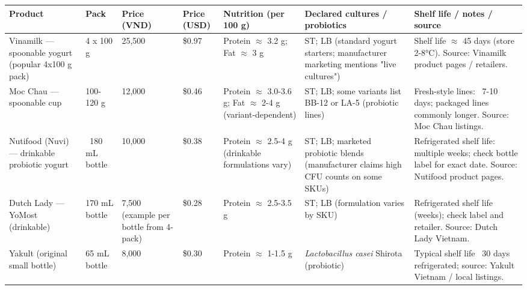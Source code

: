 \documentclass{iopjournal}
\begin{document}
\begin{table}[htbp]
  \centering
   \footnotesize
  \begin{threeparttable}
  \caption{Representative yogurt products in Vietnam — prices, nutrition and starter/probiotic notes.
    (Conversion used: 1 USD = 26,385 VND; prices and specs are illustrative snapshots from manufacturer/retailer listings.)}
  \label{tab:yogurt-vn} 
    \begin{longtable}{@{} Q T T T Q Q Q @{}}
  \toprule
  \textbf{Product} & \textbf{Pack} & \textbf{Price (VND)} & \textbf{Price (USD)} & \textbf{Nutrition (per 100 g)} & \textbf{Declared cultures / probiotics} & \textbf{Shelf life / notes / source} \\
  \midrule
  Vinamilk — spoonable yogurt (popular 4x100 g pack)
    & 4 x 100 g
    & 25,500
    & \$0.97
    & Protein $\approx$ 3.2 g; Fat $\approx$ 3 g
    & ST; LB (standard yogurt starters; manufacturer marketing mentions "live cultures")
    & Shelf life $\approx$ 45 days (store 2-8°C). Source: Vinamilk product pages / retailers. \\

  Moc Chau — spoonable cup
    & 100-120 g
    & 12,000
    & \$0.46
    & Protein $\approx$ 3.0-3.6 g; Fat $\approx$ 2-4 g (variant-dependent)
    & ST; LB; some variants list BB-12 or LA-5 (probiotic lines)
    & Fresh-style lines: ~7-10 days; packaged lines commonly longer. Source: Moc Chau listings. \\

  Nutifood (Nuvi) — drinkable probiotic yogurt
    & ~180 mL bottle
    & 10,000
    & \$0.38
    & Protein $\approx$ 2.5-4 g (drinkable formulations vary)
    & ST; LB; marketed probiotic blends (manufacturer claims high CFU counts on some SKUs)
    & Refrigerated shelf life: multiple weeks; check bottle label for exact date. Source: Nutifood product pages. \\

  Dutch Lady — YoMost (drinkable)
    & 170 mL bottle
    & 7,500 (example per bottle from 4-pack)
    & \$0.28
    & Protein $\approx$ 2.5-3.5 g
    & ST; LB (formulation varies by SKU)
    & Refrigerated shelf life (weeks); check label and retailer. Source: Dutch Lady Vietnam. \\

  Yakult (original small bottle)
    & 65 mL bottle
    & 8,000
    & \$0.30
    & Protein $\approx$ 1-1.5 g
    & \textit{Lactobacillus casei} Shirota (probiotic)
    & Typical shelf life ~30 days refrigerated; source: Yakult Vietnam / local listings. \\


\end{longtable}
\end{threeparttable}
\end{table}
\end{document}
